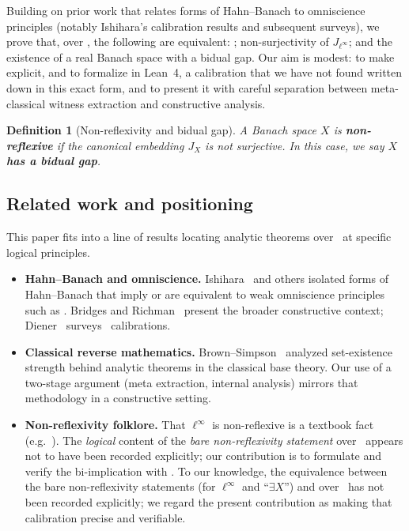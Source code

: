 \documentclass[11pt]{article}
\newtheorem{definition}[theorem]{Definition}
\newcommand{\WLPO}{\mathrm{WLPO}}
\newcommand{\BISH}{\mathrm{BISH}}
\newcommand{\CRM}{\mathrm{CRM}}
\begin{document}
Building on prior work that relates forms of Hahn--Banach to omniscience principles (notably Ishihara's calibration results and subsequent surveys), we prove that, over \BISH, the following are equivalent: \WLPO; non-surjectivity of $J_{\ell^\infty}$; and the existence of a real Banach space with a bidual gap. Our aim is modest: to make explicit, and to formalize in Lean~4, a calibration that we have not found written down in this exact form, and to present it with careful separation between meta-classical witness extraction and constructive analysis.

\begin{definition}[Non-reflexivity and bidual gap]
A Banach space $X$ is \textbf{non-reflexive} if the canonical embedding $J_X$ is not surjective. In this case, we say $X$ \textbf{has a bidual gap}.
\end{definition}

\subsection{Related work and positioning}

This paper fits into a line of results locating analytic theorems over \BISH\ at specific logical principles.

\begin{itemize}[leftmargin=2em]
\item \textbf{Hahn--Banach and omniscience.} Ishihara~\cite{Ishihara90,Ishihara06} and others isolated forms of Hahn--Banach that imply or are equivalent to weak omniscience principles such as \WLPO. Bridges and Richman~\cite{Bridges87} present the broader constructive context; Diener~\cite{DienerCRM} surveys \CRM\ calibrations.

\item \textbf{Classical reverse mathematics.} Brown--Simpson~\cite{BrownSimpson86} analyzed set-existence strength behind analytic theorems in the classical base theory. Our use of a two-stage argument (meta extraction, internal analysis) mirrors that methodology in a constructive setting.

\item \textbf{Non-reflexivity folklore.} That $\ell^\infty$ is non-reflexive is a textbook fact (e.g.\ \cite{ConwayFA,Megginson98,AlbiacKalton16}). The \emph{logical} content of the \emph{bare non-reflexivity statement} over \BISH\ appears not to have been recorded explicitly; our contribution is to formulate and verify the bi-implication with \WLPO. To our knowledge, the equivalence between the bare non-reflexivity statements (for $\ell^\infty$ and ``$\exists X$'') and \WLPO over \BISH\ has not been recorded explicitly; we regard the present contribution as making that calibration precise and verifiable.
\end{itemize}
\end{document}
